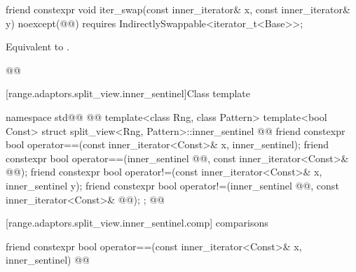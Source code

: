 %
\begin{itemdecl}
friend constexpr void iter_swap(const inner_iterator& x, const inner_iterator& y)
  noexcept(@\oldtxt{\seebelow}@)
  requires IndirectlySwappable<iterator_t<Base>>;
\end{itemdecl}

\begin{itemdescr}
\pnum
\effects Equivalent to .

\pnum
{}
\begin{codeblock}
@@
\end{codeblock}
\end{itemdescr}

[range.adaptors.split_view.inner_sentinel]{Class template }

\pnum
\begin{note}
\end{note}

\begin{codeblock}
namespace std@@ { @@
  template<class Rng, class Pattern>
  template<bool Const>
  struct split_view<Rng, Pattern>::inner_sentinel { @\newtxt{// \expos}@
    friend constexpr bool operator==(const inner_iterator<Const>& x, inner_sentinel);
    friend constexpr bool operator==(inner_sentinel @@, const inner_iterator<Const>& @@);
    friend constexpr bool operator!=(const inner_iterator<Const>& x, inner_sentinel y);
    friend constexpr bool operator!=(inner_sentinel @@, const inner_iterator<Const>& @@);
  };
}@\oldtxt{\}}@
\end{codeblock}

[range.adaptors.split_view.inner_sentinel.comp]{ comparisons}

%
\begin{itemdecl}
friend constexpr bool operator==(const inner_iterator<Const>& x, inner_sentinel)
@@
\end{itemdecl}

